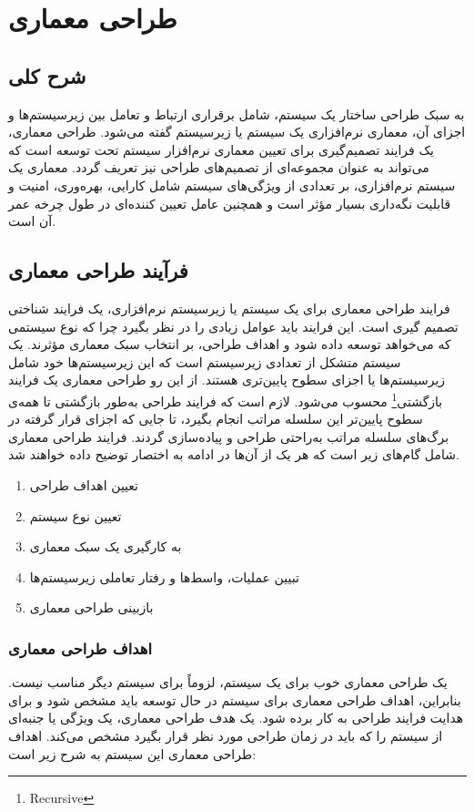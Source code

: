 \documentclass[12pt]{article}
\begin{document}
	\newpage
	\section{طراحی معماری}
	\subsection{شرح کلی}
	به سبک طراحی ساختار یک سیستم، شامل برقراری ارتباط و تعامل بین زیرسیستم‌ها و اجزای آن، معماری نرم‌افزاری یک سیستم یا زیرسیستم گفته می‌شود. طراحی معماری، یک فرایند تصمیم‌گیری برای تعیین معماری نرم‌افزار سیستم تحت توسعه است که می‌تواند به عنوان مجموعه‌ای از تصمیم‌های طراحی نیز تعریف گردد. معماری یک سیستم نرم‌افزاری، بر تعدادی از ویژگی‌های سیستم شامل کارایی، بهره‌وری، امنیت و قابلیت نگه‌داری بسیار مؤثر است و همچنین عامل تعیین کننده‌ای در طول چرخه عمر آن است.

	\subsection{فرآیند طراحی معماری}
	فرایند طراحی معماری برای یک سیستم یا زیرسیستم نرم‌افزاری، یک فرایند شناختی تصمیم گیری است. این فرایند باید عوامل زیادی را در نظر بگیرد چرا که نوع سیستمی که می‌خواهد توسعه داده شود و اهداف طراحی، بر انتخاب سبک معماری مؤثرند. یک سیستم متشکل از تعدادی زیرسیستم است که این زیرسیستم‌ها خود شامل زیرسیستم‌ها یا اجزای سطوح پایین‌تری هستند. از این رو طراحی معماری یک فرایند بازگشتی\footnote{Recursive} محسوب می‌شود. لازم است که فرایند طراحی به‌طور بازگشتی تا همه‌ی سطوح پایین‌تر این سلسله مراتب انجام بگیرد، تا جایی که اجزای قرار گرفته در برگ‌های سلسله مراتب به‌راحتی طراحی و پیاده‌سازی گردند. فرایند طراحی معماری شامل گام‌های زیر است که هر یک از آن‌ها در ادامه به اختصار توضیح داده خواهند شد.

	\begin{enumerate}
		\renewcommand{\labelenumi}{گام \arabic{enumi}.}
		\item
	تعیین اهداف طراحی
		\item
	تعیین نوع سیستم
		\item
	به کارگیری یک سبک معماری
		\item
	تبیین عملیات، واسط‌ها و رفتار تعاملی زیرسیستم‌ها
		\item
	بازبینی طراحی معماری
	\end{enumerate}

	\subsubsection{اهداف طراحی معماری}
	یک طراحی معماری خوب برای یک سیستم، لزوماً برای سیستم دیگر مناسب نیست. بنابراین، اهداف طراحی معماری برای سیستم در حال توسعه باید مشخص شود و برای هدایت فرایند طراحی به کار برده شود. یک هدف طراحی معماری، یک ویژگی یا جنبه‌ای از سیستم را که باید در زمان طراحی مورد نظر قرار بگیرد مشخص می‌کند. اهداف طراحی معماری این سیستم به شرح زیر است:
\end{document}
